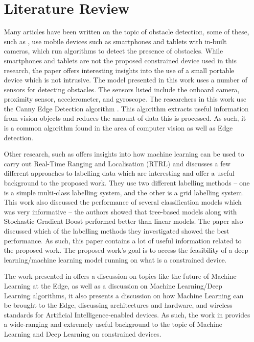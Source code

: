 \documentclass{svproc}
\begin{document}
\section{Literature Review}
Many articles have been written on the topic of obstacle detection, some of these, such as \cite{b15}, use mobile devices such as smartphones 
and tablets with in-built cameras, which run algorithms to detect the presence of obstacles. While smartphones and tablets are not the proposed 
constrained device used in this research, the paper offers interesting insights into the use of a small portable device which is not intrusive. 
The model presented in this work uses a number of sensors for detecting obstacles. The sensors listed include the onboard camera, proximity sensor, 
accelerometer, and gyroscope. The researchers in this work use the Canny Edge Detection algorithm \cite{b16}. This algorithm extracts useful 
information from vision objects and reduces the amount of data this is processed. As such, it is a common algorithm found in the area of 
computer vision as well as Edge detection.

Other research, such as \cite{b17} offers insights into how machine learning can be used to carry out Real-Time Ranging and Localisation (RTRL) 
and discusses a few different approaches to labelling data which are interesting and offer a useful background to the proposed work. 
They use two different labelling methods – one is a simple multi-class labelling system, and the other is a grid labelling system. 
This work also discussed the performance of several classification models which was very informative – the authors showed that tree-based 
models along with Stochastic Gradient Boost performed better than linear models. The paper also discussed which of the labelling methods 
they investigated showed the best performance. As such, this paper contains a lot of useful information related to the proposed work.
The proposed work’s goal is to access the feasibility of a deep learning/machine learning model running on what is a constrained device. 

The work presented in \cite{b18} offers a discussion on topics like the future of Machine Learning at the Edge, as well as a discussion 
on Machine Learning/Deep Learning algorithms, it also presents a discussion on how Machine Learning can be brought to the Edge, 
discussing architectures and hardware, and wireless standards for Artificial Intelligence-enabled devices. As such, the work in \cite{b18} provides 
a wide-ranging and extremely useful background to the topic of Machine Learning and Deep Learning on constrained devices. 
\end{document}
